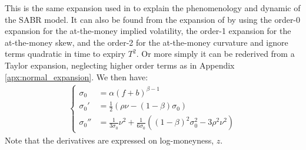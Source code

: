 \documentclass[]{rAMF2e}
\begin{document}
This is the same expansion used in \citep[equation (3.1a)]{hagan2002managing} to explain the phenomenology and dynamic of the SABR model. It can also be found from the expansion of \citep{lorig2014implied} by using the order-0 expansion for the at-the-money implied volatility, the order-1 expansion for the at-the-money skew, and the order-2 for the at-the-money curvature and ignore terms quadratic in time to expiry $T^2$. Or more simply it can be rederived from a Taylor expansion, neglecting higher order terms as in Appendix \ref{apx:normal_expansion}. We then have:
\begin{align}
\begin{cases}
\sigma_0 &= \alpha(f+b)^{\beta-1}\\
\sigma_0' &= \frac{1}{2}\left(\rho \nu - (1-\beta)\sigma_0\right)\\
\sigma_0'' &= \frac{1}{3\sigma_0}\nu^2+\frac{1}{6\sigma_0}\left((1-\beta)^2\sigma_0^2 - 3\rho^2\nu^2\right)
\end{cases}
\end{align} 
Note that the derivatives are expressed on log-moneyness, $z$.
\end{document}

